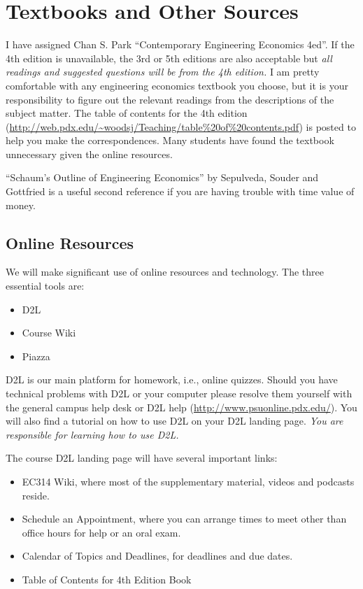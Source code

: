 \documentclass[letterpaper,10pt]{article}
\begin{document}


\section{Textbooks and Other Sources}
I have assigned Chan S. Park ``Contemporary Engineering Economics
4ed''.  If the 4th edition is unavailable, the 3rd or 5th editions are also
acceptable but \emph{all readings and suggested questions will be from
  the 4th edition.} I am pretty comfortable with any engineering
economics textbook you choose, but it is your responsibility to figure
out the relevant readings from the descriptions of the subject matter.
The table of contents for the 4th edition (\url{http://web.pdx.edu/~woodsj/Teaching/table\%20of\%20contents.pdf}) is posted to help you
make the correspondences.  Many students have found the textbook unnecessary given the online resources.

``Schaum's Outline of Engineering Economics'' by Sepulveda, Souder and Gottfried is a useful second reference if you are having trouble with time value of money.

\subsection{Online Resources}
We will make significant use of online resources and technology.  The
three essential tools are:
\begin{itemize}
\item D2L
\item Course Wiki
\item Piazza
\end{itemize}

D2L is our main platform for homework, i.e., online quizzes.  Should you have technical problems with D2L
or your computer please resolve them yourself with the general campus
help desk or D2L help (\url{http://www.psuonline.pdx.edu/}).  You will
also find a tutorial on how to use D2L on your D2L landing page.
\emph{You are responsible for learning how to use D2L.}


The course D2L landing page will have several important links:
\begin{itemize}
\item EC314 Wiki, where most of the supplementary material, videos and
  podcasts reside.
\item Schedule an Appointment, where you can arrange times to meet
  other than office hours for help or an oral exam.
\item Calendar of Topics and Deadlines, for deadlines and due dates.
\item Table of Contents for 4th Edition Book
\end{itemize}
\end{document}
